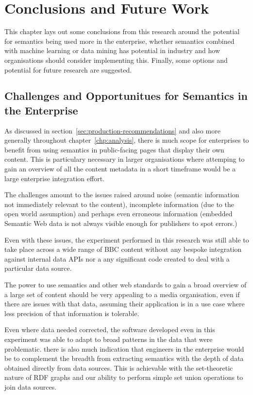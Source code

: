 \chapter{Conclusions and Future Work}

This chapter lays out some conclusions from this research around the potential
for semantics being used more in the enterprise, whether semantics combined
with machine learning or data mining has potential in industry and how
organisations should consider implementing this. Finally, some options and
potential for future research are suggested.

\section{Challenges and Opportunitues for Semantics in the Enterprise}

As discussed in section~\ref{sec:production-recommendations} and also more
generally throughout chapter~\ref{chp:analysis}, there is much scope for
enterprises to benefit from using semantics in public-facing pages that display
their own content. This is particulary necessary in larger organisations where
attemping to gain an overview of all the content metadata in a short timeframe
would be a large enterprise integration effort.

The challenges amount to the issues raised around noise (semantic information
not immediately relevant to the content), incomplete information (due to
the open world assumption) and perhaps even erroneous information (embedded
Semantic Web data is not always visible enough for publishers to spot errors.)

Even with these issues, the experiment performed in this research was still
able to take place across a wide range of BBC content without any bespoke
integration against internal data APIs nor a any significant code created
to deal with a particular data source.

The power to use semantics and other web standards to gain a broad overview
of a large set of content should be very appealing to a media organisation,
even if there are issues with that data, assuming their application is in
a use case where less precision of that information is tolerable.

Even where data needed corrected, the software developed even in this
experiment was able to adapt to broad patterns in the data that were
problematic. there is also much indication that engineers in the enterprise
would be to complement the breadth from extracting semantics with the depth
of data obtained directly from data sources. This is achievable with the
set-theoretic nature of RDF graphs and our ability to perform simple set
union operations to join data sources.

